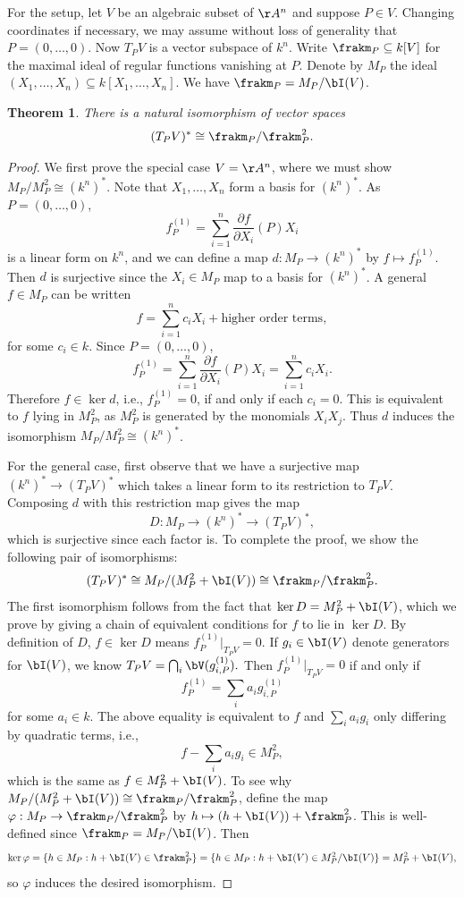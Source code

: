 \documentclass[12pt]{amsart}
\theoremstyle{plain}
\newtheorem{theorem}{Theorem}%
\begin{document}
For the setup, let $V$ be an algebraic subset of $\AA^n$ and suppose $P \in V$.
Changing coordinates if necessary, we may assume without loss of generality that $P=(0, \ldots, 0)$.
Now $T_PV$ is a vector subspace of $k^n$.
Write $\frakm_P\subseteq k[V]$ for the maximal ideal of regular functions vanishing at $P$.
Denote by $M_P$ the ideal $(X_1, \ldots, X_n) \subseteq k[X_1,\ldots, X_n]$.
We have $\frakm_P=M_P/\bI(V)$.

\begin{theorem}
There is a natural isomorphism of vector spaces
$$(T_PV)^* \cong \frakm_P/\frakm_P^2.$$
\end{theorem}
\begin{proof}
We first prove the special case $V=\AA^n$, where we must show $M_P/M_P^2\cong(k^n)^*$.
Note that $X_1, \ldots, X_n$ form a basis for $(k^n)^*$.
As $P=(0, \ldots, 0)$,
$$f_P^{(1)}=\sum_{i=1}^n \frac{\partial f}{\partial X_i}(P) X_i$$
is a linear form on $k^n$, and we can define a map $d : M_P\to(k^n)^*$ by $f \mapsto f_P^{(1)}$.
Then $d$ is surjective since the $X_i \in M_P$ map to a basis for $(k^n)^*$.
A general $f \in M_P$ can be written
$$f=\sum_{i=1}^n c_i X_i + \text{higher order terms},$$
for some $c_i \in k$.
Since $P=(0,\ldots,0)$,
$$f_P^{(1)}=\sum_{i=1}^n\frac{\partial f}{\partial X_i}(P) X_i = \sum_{i=1}^n c_i X_i.$$
Therefore $f \in \ker d$, i.e., $f_P^{(1)} = 0$, if and only if each $c_i=0$.
This is equivalent to $f$ lying in $M_P^2$, as $M_P^2$ is generated by the monomials $X_i X_j$.
Thus $d$ induces the isomorphism $M_P/M_P^2 \cong (k^n)^*$.

For the general case, first observe that we have a surjective map $(k^n)^* \to (T_PV)^*$ which takes a linear form to its restriction to $T_PV$.
Composing $d$ with this restriction map gives the map
$$D:M_P \to (k^n)^* \to (T_PV)^*,$$
which is surjective since each factor is.
To complete the proof, we show the following pair of isomorphisms:
$$(T_PV)^* \cong M_P/(M_P^2+\bI(V)) \cong \frakm_P/\frakm_P^2.$$
The first isomorphism follows from the fact that $\ker D = M_P^2+\bI(V)$, which we prove by giving a chain of equivalent conditions for $f$ to lie in $\ker D$.
By definition of $D$, $f \in \ker D$ means $f_P^{(1)} \big|_{T_PV} = 0$.
If $g_i \in \bI(V)$ denote generators for $\bI(V)$, we know $T_PV = \bigcap_i \bV(g_{i,P}^{(1)}).$
Then $f_P^{(1)} \big|_{T_PV}=0$ if and only if 
$$f_P^{(1)} = \sum_i a_i g_{i,P}^{(1)}$$
for some $a_i \in k$.
The above equality is equivalent to $f$ and $\sum_i a_i g_i$ only differing by quadratic terms, i.e., 
$$f - \sum_i a_i g_i \in M_P^2,$$
which is the same as $f \in M_P^2 + \bI(V)$.
To see why $M_P/(M_P^2+\bI(V)) \cong \frakm_P/\frakm_P^2$, define the map $\varphi : M_P \to \frakm_P/\frakm_P^2$ by $h \mapsto (h+\bI(V)) + \frakm_P^2$.
This is well-defined since $\frakm_P=M_P/\bI(V)$.
Then
$$\ker \varphi = \{h \in M_P : h + \bI(V) \in \frakm_P^2\}=\{h \in M_P:h+\bI(V)\in M_P^2/\bI(V)\}=M_P^2+\bI(V),$$
so $\varphi$ induces the desired isomorphism.
\end{proof}
\end{document}
